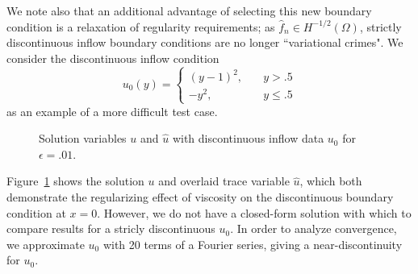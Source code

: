 \documentclass[11pt,onecolumn]{scrartcl}
\begin{document}
We note also that an additional advantage of selecting this new boundary condition is a relaxation of regularity requirements; as $\widehat{f}_n \in H^{-1/2}(\Omega)$, strictly discontinuous inflow boundary conditions are no longer ``variational crimes".  We consider the discontinuous inflow condition
\[
u_0(y) = \begin{cases}
(y-1)^2, \quad &y>.5\\
-y^2, \quad &y\leq .5 
\end{cases}
\]
as an example of a more difficult test case. 

\begin{figure}[h!]
\centering
{}
\caption{Solution variables $u$ and $\widehat{u}$ with discontinuous inflow data $u_0$ for $\epsilon = .01$.}
\label{disc_sol}
\end{figure}
Figure~\ref{disc_sol} shows the solution $u$ and overlaid trace variable $\widehat{u}$, which both demonstrate the regularizing effect of viscosity on the discontinuous boundary condition at $x=0$. However, we do not have a closed-form solution with which to compare results for a stricly discontinuous $u_0$.  In order to analyze convergence, we approximate $u_0$ with 20 terms of a Fourier series, giving a near-discontinuity for $u_0$.  
\end{document}
